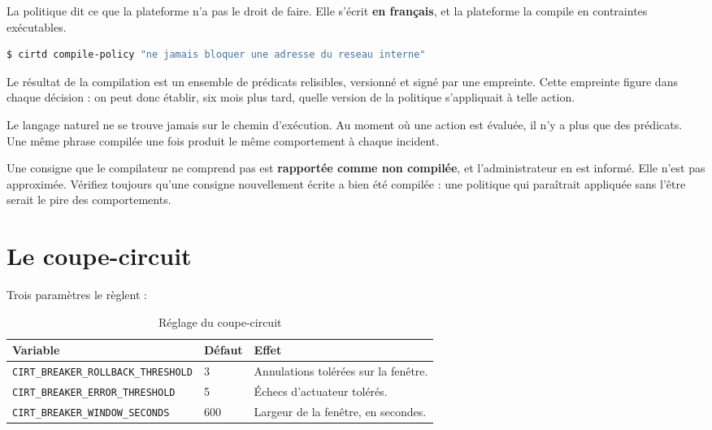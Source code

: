 La politique dit ce que la plateforme n'a pas le droit de faire. Elle s'écrit
\textbf{en français}, et la plateforme la compile en contraintes exécutables.

\begin{lstlisting}[language=bash]
$ cirtd compile-policy "ne jamais bloquer une adresse du reseau interne"
\end{lstlisting}

Le résultat de la compilation est un ensemble de prédicats relisibles, versionné
et signé par une empreinte. Cette empreinte figure dans chaque décision : on
peut donc établir, six mois plus tard, quelle version de la politique
s'appliquait à telle action.

\begin{tcolorbox}[colback=green!4!white, colframe=darkgreen,
  title=\textbf{Bon à savoir --- pourquoi compiler à l'avance},
  fonttitle=\bfseries, boxrule=0.6pt]
Le langage naturel ne se trouve jamais sur le chemin d'exécution. Au moment où
une action est évaluée, il n'y a plus que des prédicats. Une même phrase
compilée une fois produit le même comportement à chaque incident.
\end{tcolorbox}

\begin{tcolorbox}[colback=orange!5!white, colframe=orange!70!black,
  title=\textbf{Attention}, fonttitle=\bfseries, boxrule=0.6pt]
Une consigne que le compilateur ne comprend pas est \textbf{rapportée comme non
compilée}, et l'administrateur en est informé. Elle n'est pas approximée.
Vérifiez toujours qu'une consigne nouvellement écrite a bien été compilée :
une politique qui paraîtrait appliquée sans l'être serait le pire des
comportements.
\end{tcolorbox}

\section{Le coupe-circuit}

Trois paramètres le règlent :

\begin{table}[h]
\centering
\begin{tabular}{@{}p{6.4cm}p{1.8cm}p{5.2cm}@{}}
\toprule
\textbf{Variable} & \textbf{Défaut} & \textbf{Effet} \\
\midrule
\texttt{CIRT\_BREAKER\_ROLLBACK\_THRESHOLD} & 3 &
Annulations tolérées sur la fenêtre. \\[6pt]
\texttt{CIRT\_BREAKER\_ERROR\_THRESHOLD} & 5 &
Échecs d'actuateur tolérés. \\[6pt]
\texttt{CIRT\_BREAKER\_WINDOW\_SECONDS} & 600 &
Largeur de la fenêtre, en secondes. \\
\bottomrule
\end{tabular}
\caption{Réglage du coupe-circuit}
\end{table}

